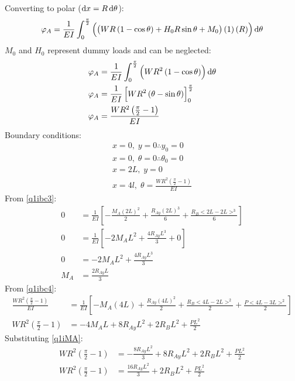 \documentclass[11pt]{article}
\numberwithin{equation}{section}
\begin{document}
Converting to polar ($\dif x = R \dif \theta$):
\begin{align}
    \varphi_A = \frac{1}{EI}\int_0^{\frac{\pi}{2}} \left( \left(WR \left(1-\cos \theta\right)+H_0 R\sin\theta + M_0 \right)\left(1\right)\left(R\right) \right)\dif \theta
\end{align}
$M_0$ and $H_0$ represent dummy loads and can be neglected:
\begin{align}
    \varphi_A &= \frac{1}{EI}\int_0^{\frac{\pi}{2}} \left(WR^2\left(1-\cos\theta\right)\right)\dif \theta\\
    \varphi_A &= \frac{1}{EI} \left[WR^2\left(\theta-\sin\theta\right)\right]^{\frac{\pi}{2}}_0\\
    \varphi_A &= \frac{WR^2\left(\frac{\pi}{2}-1\right)}{EI}
\end{align}
Boundary conditions:
\begin{gather}
    x = 0, \; y = 0 \therefore y_0 = 0\\
    x = 0, \; \theta = 0 \therefore \theta_0 = 0\\
    x = 2L, \; y = 0 \label{q1ibc3}\\
    x = 4l, \; \theta = \frac{WR^2\left(\frac{\pi}{2}-1\right)}{EI} \label{q1ibc4}
\end{gather}
From \ref{q1ibc3}:
\begin{align}
    0 &= \frac{1}{EI} \left[-\frac{M_A\left(2L\right)^2}{2} + \frac{R_{Ay}\left(2L\right)^3}{6} + \frac{R_B <2L - 2L>^3}{6}\right]\\
    0 &= \frac{1}{EI} \left[-2M_A L^2 + \frac{4R_{Ay}L^3}{3} + 0\right]\\
    0 &= -2M_AL^2 + \frac{4R_{Ay}L^3}{3}\\
    M_A &= \frac{2R_{Ay}L}{3} \label{q1iMA}
\end{align}
From \ref{q1ibc4}:
\begin{align}
    \frac{WR^2\left(\frac{\pi}{2}-1\right)}{EI} &= \frac{1}{EI} \left[-M_A \left(4L\right) + \frac{R_{Ay}\left(4L\right)^2}{2} + \frac{R_B<4L-2L>^2}{2} + \frac{P<4L-3L>^2}{2}\right]\\
    WR^2\left(\frac{\pi}{2}-1\right) &= -4M_A L + 8R_{Ay}L^2 + 2R_BL^2 + \frac{PL^2}{2}
\end{align}
Substituting \ref{q1iMA}:
\begin{align}
    WR^2\left(\frac{\pi}{2}-1\right) &= -\frac{8R_{Ay}L^2}{3} + 8R_{Ay}L^2 + 2R_BL^2 + \frac{PL^2}{2}\\
    WR^2\left(\frac{\pi}{2}-1\right) &= \frac{16R_{Ay}L^2}{3} + 2R_BL^2 + \frac{PL^2}{2}
\end{align}
\end{document}

